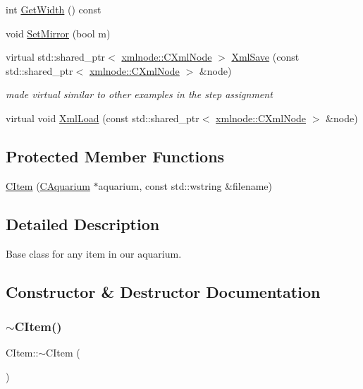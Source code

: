 \begin{DoxyCompactItemize}
\item 
int \mbox{\hyperlink{class_c_item_a0109712c4628b8d5713291de07a0bc1b}{Get\+Width}} () const
\item 
void \mbox{\hyperlink{class_c_item_a8718f7e56783f5c974fd70b934e4fb79}{Set\+Mirror}} (bool m)
\item 
virtual std\+::shared\+\_\+ptr$<$ \mbox{\hyperlink{classxmlnode_1_1_c_xml_node}{xmlnode\+::\+C\+Xml\+Node}} $>$ \mbox{\hyperlink{class_c_item_a10584fa8e05d3abe125f95f0ceecdedd}{Xml\+Save}} (const std\+::shared\+\_\+ptr$<$ \mbox{\hyperlink{classxmlnode_1_1_c_xml_node}{xmlnode\+::\+C\+Xml\+Node}} $>$ \&node)
\begin{DoxyCompactList}\small\item\em made virtual similar to other examples in the step assignment \end{DoxyCompactList}\item 
virtual void \mbox{\hyperlink{class_c_item_ad0bad7d47a01ff133734b5498f9ca3bb}{Xml\+Load}} (const std\+::shared\+\_\+ptr$<$ \mbox{\hyperlink{classxmlnode_1_1_c_xml_node}{xmlnode\+::\+C\+Xml\+Node}} $>$ \&node)
\end{DoxyCompactItemize}
\subsection*{Protected Member Functions}
\begin{DoxyCompactItemize}
\item 
\mbox{\hyperlink{class_c_item_a376d86b9ee99285ec157f1fb3a5e1e35}{C\+Item}} (\mbox{\hyperlink{class_c_aquarium}{C\+Aquarium}} $\ast$aquarium, const std\+::wstring \&filename)
\end{DoxyCompactItemize}


\subsection{Detailed Description}
Base class for any item in our aquarium. 

\subsection{Constructor \& Destructor Documentation}
\mbox{\label{class_c_item_a2487c6e822ed0e850544f1745b43f584}} 
\subsubsection{\texorpdfstring{$\sim$\+C\+Item()}{~CItem()}}
{\footnotesize\ttfamily C\+Item\+::$\sim$\+C\+Item (\begin{DoxyParamCaption}{ }\end{DoxyParamCaption})\hspace{0.3cm}{\ttfamily [virtual]}}

